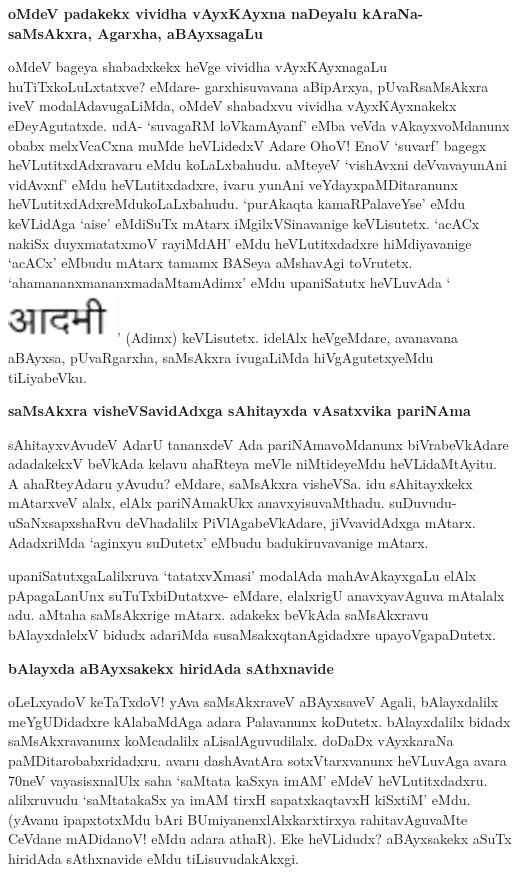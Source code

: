 \noindent
{\bf\large{oMdeV padakekx vividha vAyxKAyxna naDeyalu kAraNa- saMsAkxra, Agarxha, aBAyxsagaLu}}\label{page212}

oMdeV bageya shabadxkekx heVge vividha vAyxKAyxnagaLu huTiTxkoLuLxtatxve? eMdare- garxhisuvavana aBipArxya, pUvaRsaMsAkxra iveV modalAdavugaLiMda, oMdeV shabadxvu vividha vAyxKAyxnakekx eDeyAgutatxde. udA- `suvagaRM loVkamAyanf' eMba veVda vAkayxvoMdanunx obabx melxVcaCxna muMde heVLidedxV Adare OhoV! EnoV `suvarf' bagegx heVLutitxdAdxravaru eMdu koLaLxbahudu. aMteyeV `vishAvxni deVvavayunAni vidAvxnf' eMdu heVLutitxdadxre, ivaru yunAni veYdayxpaMDitaranunx heVLutitxdAdxreMdukoLaLxbahudu. `purAkaqta kamaRPalaveYse' eMdu keVLidAga `aise' eMdiSuTx mAtarx iMgilxVSinavanige keVLisutetx. `acACx nakiSx duyxmatatxmoV rayiMdAH'\label{113} eMdu heVLutitxdadxre hiMdiyavanige `acACx' eMbudu mAtarx tamamx BASeya aMshavAgi toVrutetx. `ahamananxmananxmadaMtamAdimx' eMdu upaniSatutx heVLuvAda `{\includegraphics[scale=.6]{fig2.eps}}' (Adimx) keVLisutetx. idelAlx heVgeMdare, avanavana aBAyxsa, pUvaRgarxha, saMsAkxra ivugaLiMda hiVgAgutetxyeMdu tiLiyabeVku.

\noindent
{\bf\large{saMsAkxra visheVSavidAdxga sAhitayxda vAsatxvika pariNAma}}\label{page213}

sAhitayxvAvudeV AdarU tananxdeV Ada pariNAmavoMdanunx biVrabeVkAdare adadakekxV beVkAda kelavu ahaRteya meVle niMtideyeMdu heVLidaMtAyitu. A ahaRteyAdaru yAvudu? eMdare, saMsAkxra visheVSa. idu sAhitayxkekx mAtarxveV alalx, elAlx pariNAmakUkx anavxyisuvaMthadu. suDuvudu- uSaNxsapxshaRvu deVhadalilx PiVlAgabeVkAdare, jiVvavidAdxga mAtarx. AdadxriMda `aginxyu suDutetx' eMbudu badukiruvavanige mAtarx.

upaniSatutxgaLalilxruva `tatatxvXmasi' modalAda mahAvAkayxgaLu elAlx pApagaLanUnx suTuTxbiDutatxve- eMdare, elalxrigU anavxyavAguva mAtalalx adu. aMtaha saMsAkxrige mAtarx. adakekx beVkAda saMsAkxravu bAlayxdalelxV bidudx adariMda susaMsakxqtanAgidadxre upayoVgapaDutetx.

\noindent
{\bf\large{bAlayxda aBAyxsakekx hiridAda sAthxnavide}}\label{page213}

oLeLxyadoV keTaTxdoV! yAva saMsAkxraveV aBAyxsaveV Agali, bAlayxdalilx meYgUDidadxre kAlabaMdAga adara Palavanunx koDutetx. bAlayxdalilx bidadx saMsAkxravanunx koMcadalilx aLisalAguvudilalx. doDaDx vAyxkaraNa paMDitarobabxridadxru. avaru dashAvatAra sotxVtarxvanunx heVLuvAga avara 70neV vayasisxnalUlx saha `saMtata kaSxya imAM' eMdeV heVLutitxdadxru. alilxruvudu `saMtatakaSx ya imAM\label{213} tirxH sapatxkaqtavxH kiSxtiM' eMdu. (yAvanu ipapxtotxMdu bAri BUmiyanenxlAlxkarxtirxya rahitavAguvaMte CeVdane mADidanoV! eMdu adara athaR). Eke heVLidudx? aBAyxsakekx aSuTx hiridAda sAthxnavide eMdu tiLisuvudakAkxgi.

